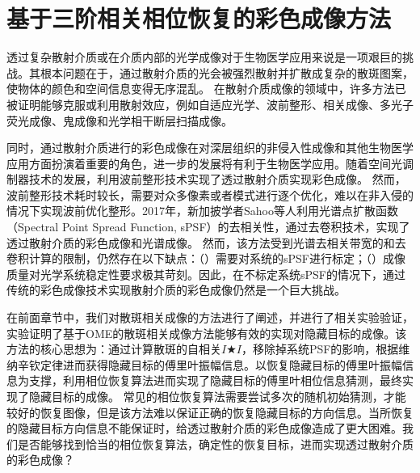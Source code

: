 
\chapter{基于三阶相关相位恢复的彩色成像方法}

透过复杂散射介质或在介质内部的光学成像对于生物医学应用来说是一项艰巨的挑战。其根本问题在于，通过散射介质的光会被强烈散射并扩散成复杂的散斑图案，使物体的颜色和空间信息变得无序混乱\cite{Freund1988,goodman_speckle_2007,bertolotti_non-invasive_2012,katz_non-invasive_2014,Yllmaz2019}。
在散射介质成像的领域中，许多方法已被证明能够克服或利用散射效应\cite{newman_imaging_2016,godara_adaptive_2010,katz_looking_2012,larson_water-soluble_2003,liu_imaging_2011,paniagua-diaz_blind_2019}，例如自适应光学\cite{godara_adaptive_2010}、波前整形\cite{katz_looking_2012}、相关成像\cite{bertolotti_non-invasive_2012,katz_non-invasive_2014}、多光子荧光成像\cite{liu_imaging_2011,larson_water-soluble_2003}、鬼成像\cite{paniagua-diaz_blind_2019}和光学相干断层扫描成像\cite{park_full-field_2014}。

同时，通过散射介质进行的彩色成像\cite{conkey_color_2012,leung_acousto-optic_2013,sahoo_single-shot_2017}在对深层组织的非侵入性成像和其他生物医学应用方面扮演着重要的角色，进一步的发展将有利于生物医学应用。随着空间光调制器技术的发展，利用波前整形技术实现了透过散射介质实现彩色成像\cite{leung_acousto-optic_2013,sahoo_single-shot_2017}。
然而，波前整形技术耗时较长，需要对众多像素或者模式进行逐个优化，难以在非入侵的情况下实现波前优化整形。2017年，新加披学者Sahoo等人\cite{sahoo_single-shot_2017}利用光谱点扩散函数（Spectral Point Spread Function, sPSF）\cite{Freund1988,goodman_speckle_2007}的去相关性，通过去卷积技术，实现了透过散射介质的彩色成像和光谱成像。
然而，该方法受到光谱去相关带宽的和去卷积计算的限制，仍然存在以下缺点：（）需要对系统的sPSF进行标定；（）成像质量对光学系统稳定性要求极其苛刻。因此，在不标定系统sPSF的情况下，通过传统的彩色成像技术实现散射介质的彩色成像仍然是一个巨大挑战。

在前面章节中，我们对散斑相关成像的方法进行了阐述，并进行了相关实验验证，实验证明了基于OME的散斑相关成像方法能够有效的实现对隐藏目标的成像。该方法的核心思想为：通过计算散斑的自相关$I \bigstar I$，移除掉系统PSF的影响，根据维纳辛钦定律进而获得隐藏目标的傅里叶振幅信息。以恢复隐藏目标的傅里叶振幅信息为支撑，利用相位恢复算法进而实现了隐藏目标的傅里叶相位信息猜测，最终实现了隐藏目标的成像。
常见的相位恢复算法需要尝试多次的随机初始猜测，才能较好的恢复图像，但是该方法难以保证正确的恢复隐藏目标的方向信息。当所恢复的隐藏目标方向信息不能保证时，给透过散射介质的彩色成像造成了更大困难。我们是否能够找到恰当的相位恢复算法，确定性的恢复目标，进而实现透过散射介质的彩色成像？

